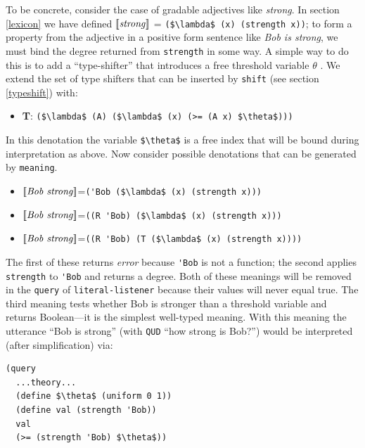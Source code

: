 \documentclass[pdfextras]{handbook}
\newcommand{\llbracket}{\ensuremath{\left [\!\left [}}%
\newcommand{\rrbracket}{\ensuremath{\right ]\!\right ]}}
\providecommand{\sv}[1]{\ensuremath{\llbracket \mathit{#1} \rrbracket}}
\begin{document}
To be concrete, consider the case of gradable adjectives like \emph{strong}. In section \ref{lexicon} we have defined \sv{\mathit{strong}} = \lstinline[mathescape]{($\lambda$ (x) (strength x))}; to form a property from the adjective in a positive form sentence like \emph{Bob is strong}, we must bind the degree returned from \lstinline{strength} in some way.
A simple way to do this is to add a ``type-shifter'' that introduces a free threshold variable $\theta$ \citep[See for example][]{neeleman2004degree}. We extend the set of type shifters that can be inserted by \lstinline{shift} (see section \ref{typeshift}) with:
\begin{itemize}
\item \textbf{T}:  \lstinline[mathescape]{($\lambda$ (A) ($\lambda$ (x) (>= (A x) $\theta$)))}
\end{itemize}
In this denotation the variable \lstinline[mathescape]{$\theta$} is a free index that will be bound during interpretation as above.
Now consider possible denotations that can be generated by \lstinline{meaning}.
\begin{itemize}
\item \sv{Bob\ strong}=\lstinline[mathescape]{('Bob ($\lambda$ (x) (strength x)))}
\item \sv{Bob\ strong}=\lstinline[mathescape]{((R 'Bob) ($\lambda$ (x) (strength x)))}
\item \sv{Bob\ strong}=\lstinline[mathescape]{((R 'Bob) (T ($\lambda$ (x) (strength x))))}
\end{itemize}
The first of these returns \emph{error} because \lstinline{'Bob} is not a function; the second applies \lstinline{strength} to \lstinline{'Bob} and returns a degree. Both of these meanings will be removed in the \lstinline{query} of \lstinline{literal-listener} because their values will never equal true. The third meaning tests whether Bob is stronger than a threshold variable and returns Boolean---it is the simplest well-typed meaning.
With this meaning the utterance ``Bob is strong'' (with \lstinline{QUD} ``how strong is Bob?'') would be interpreted (after simplification) via:
\begin{lstlisting}[mathescape]
(query
  ...theory...
  (define $\theta$ (uniform 0 1))
  (define val (strength 'Bob))
  val
  (>= (strength 'Bob) $\theta$))
\end{lstlisting}
\end{document}
